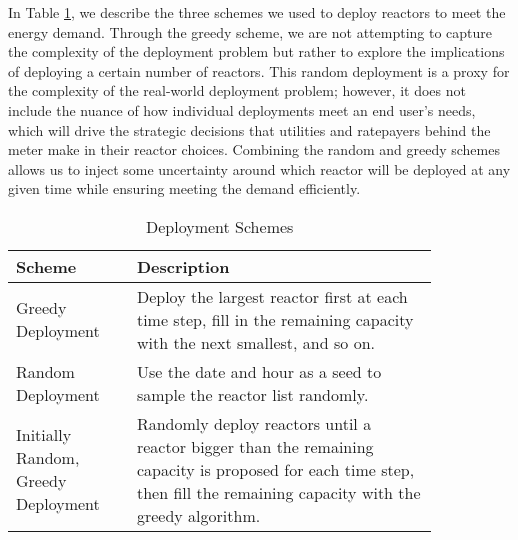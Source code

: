 \documentclass{anstrans}
\begin{document}
In Table \ref{tab:deployment_schemes}, we describe the three schemes we used to deploy reactors to meet the energy demand. Through the greedy scheme, we are not attempting to capture the complexity of the deployment problem but rather to explore the implications of deploying a certain number of reactors. This random deployment is a proxy for the complexity of the real-world deployment problem; however, it does not include the nuance of how individual deployments meet an end user's needs, which will drive the strategic decisions that utilities and ratepayers behind the meter make in their reactor choices. Combining the random and greedy schemes allows us to inject some uncertainty around which reactor will be deployed at any given time while ensuring meeting the demand efficiently.

\begin{table}[h]
  \centering
  \caption{Deployment Schemes}
  \label{tab:deployment_schemes}
  \begin{tabular}{>{\raggedright}p{0.24\linewidth}>{\raggedright\arraybackslash}p{0.60\linewidth}}
      \hline
      Scheme & Description \\
      \hline
      Greedy Deployment & Deploy the largest
      reactor first at each time step, fill in the remaining capacity with
      the next smallest, and so on. \\
      Random Deployment & Use the date and hour as a seed to sample the
      reactor list randomly. \\
      Initially Random, Greedy Deployment & Randomly deploy reactors until
      a reactor bigger than the remaining capacity is proposed for each time step,
      then fill the remaining capacity with the greedy algorithm. \\
      \hline
  \end{tabular}
\end{table}


\end{document}
